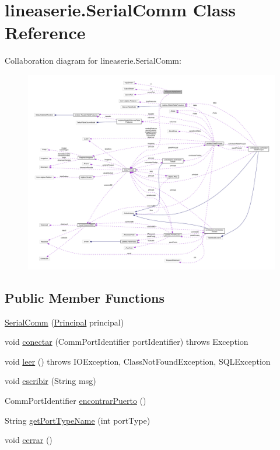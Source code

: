 \hypertarget{classlineaserie_1_1_serial_comm}{}\section{lineaserie.\+Serial\+Comm Class Reference}
\label{classlineaserie_1_1_serial_comm}


Collaboration diagram for lineaserie.\+Serial\+Comm\+:
\nopagebreak
\begin{figure}[H]
\begin{center}
\leavevmode
\includegraphics[width=350pt]{classlineaserie_1_1_serial_comm__coll__graph}
\end{center}
\end{figure}
\subsection*{Public Member Functions}
\begin{DoxyCompactItemize}
\item 
\mbox{\hyperlink{classlineaserie_1_1_serial_comm_af7acba71f36fc78ac2555f52cb6e6c91}{Serial\+Comm}} (\mbox{\hyperlink{classvistas_1_1_principal}{Principal}} principal)
\item 
void \mbox{\hyperlink{classlineaserie_1_1_serial_comm_a877035aa389c7d3ceef75f1927afd4d5}{conectar}} (Comm\+Port\+Identifier port\+Identifier)  throws Exception     
\item 
void \mbox{\hyperlink{classlineaserie_1_1_serial_comm_a9e5dc899a435cb7bbd14c50af1e69a9e}{leer}} ()  throws I\+O\+Exception, Class\+Not\+Found\+Exception, S\+Q\+L\+Exception     
\item 
void \mbox{\hyperlink{classlineaserie_1_1_serial_comm_aafba8fce6137b4b5a5e7795f07fef02c}{escribir}} (String msg)
\item 
Comm\+Port\+Identifier \mbox{\hyperlink{classlineaserie_1_1_serial_comm_ac940f6b749e1137f5f1233b320e0e46f}{encontrar\+Puerto}} ()
\item 
String \mbox{\hyperlink{classlineaserie_1_1_serial_comm_ae0ae445e9464e90c1f4ebe3e943d0788}{get\+Port\+Type\+Name}} (int port\+Type)
\item 
void \mbox{\hyperlink{classlineaserie_1_1_serial_comm_a4bc07b152edbc3d04b42677ee93e3504}{cerrar}} ()
\end{DoxyCompactItemize}



